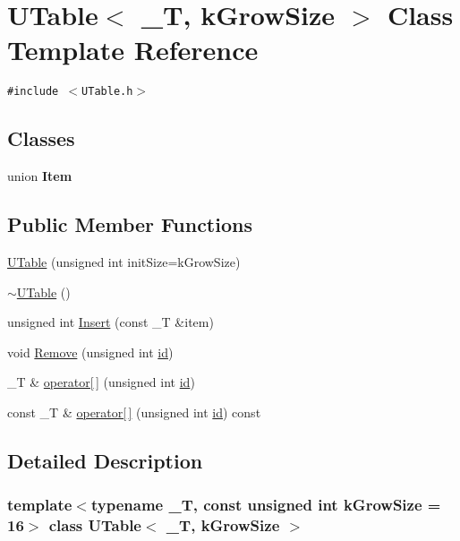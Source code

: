 \hypertarget{class_u_table}{
\section{UTable$<$ \_\-T, kGrowSize $>$ Class Template Reference}
\label{class_u_table}
}
{\tt \#include $<$UTable.h$>$}

\subsection*{Classes}
\begin{CompactItemize}
\item 
union \textbf{Item}
\end{CompactItemize}
\subsection*{Public Member Functions}
\begin{CompactItemize}
\item 
\hyperlink{class_u_table_fdf86bd1f8e6acda65bb45e44bfb29fa}{UTable} (unsigned int initSize=kGrowSize)
\item 
\hyperlink{class_u_table_4b646a71fc7c8a361bd619aa94868f40}{$\sim$UTable} ()
\item 
unsigned int \hyperlink{class_u_table_b9e88bfef77b8b93b2fed9f321b1825a}{Insert} (const \_\-T \&item)
\item 
void \hyperlink{class_u_table_2009dc81fe70d8cef0077e666845e6e1}{Remove} (unsigned int \hyperlink{glext__bak_8h_58c2a664503e14ffb8f21012aabff3e9}{id})
\item 
\_\-T \& \hyperlink{class_u_table_9b6aee18e0280b058fca5b3c5b59b98c}{operator\mbox{[}$\,$\mbox{]}} (unsigned int \hyperlink{glext__bak_8h_58c2a664503e14ffb8f21012aabff3e9}{id})
\item 
const \_\-T \& \hyperlink{class_u_table_3cf8eac3500402b6f4badba5c1b7fab4}{operator\mbox{[}$\,$\mbox{]}} (unsigned int \hyperlink{glext__bak_8h_58c2a664503e14ffb8f21012aabff3e9}{id}) const 
\end{CompactItemize}


\subsection{Detailed Description}
\subsubsection*{template$<$typename \_\-T, const unsigned int kGrowSize = 16$>$ class UTable$<$ \_\-T, kGrowSize $>$}



